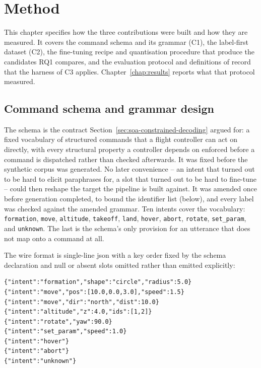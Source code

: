 \chapter{Method}
\label{chap:method}

This chapter specifies how the three contributions were built and how they are measured. It covers
the command schema and its grammar (C1), the label-first dataset (C2), the fine-tuning recipe and
quantisation procedure that produce the candidates RQ1 compares, and the evaluation protocol and
definitions of record that the harness of C3 applies. Chapter~\ref{chap:results} reports what that
protocol measured.

\section{Command schema and grammar design}
\label{sec:schema}
The schema is the contract Section~\ref{sec:soa-constrained-decoding} argued for: a fixed vocabulary of
structured commands that a flight controller can act on directly, with every structural property a
controller depends on enforced before a command is dispatched rather than checked afterwards. It
was fixed before the synthetic corpus was generated. No later convenience -- an intent that turned
out to be hard to elicit paraphrases for, a slot that turned out to be hard to fine-tune -- could
then reshape the target the pipeline is built against. It was amended once before generation
completed, to bound the identifier list (below), and every label was checked against the amended
grammar. Ten intents cover the vocabulary: \texttt{formation}, \texttt{move}, \texttt{altitude},
\texttt{takeoff}, \texttt{land}, \texttt{hover}, \texttt{abort}, \texttt{rotate},
\texttt{set\_param}, and \texttt{unknown}. The last is the schema's only provision for an utterance
that does not map onto a command at all.

The wire format is single-line \gls{json} with a key order fixed by the schema declaration and null
or absent slots omitted rather than emitted explicitly:

\begin{lstlisting}[basicstyle=\ttfamily\small, breaklines=true]
{"intent":"formation","shape":"circle","radius":5.0}
{"intent":"move","pos":[10.0,0.0,3.0],"speed":1.5}
{"intent":"move","dir":"north","dist":10.0}
{"intent":"altitude","z":4.0,"ids":[1,2]}
{"intent":"rotate","yaw":90.0}
{"intent":"set_param","speed":1.0}
{"intent":"hover"}
{"intent":"abort"}
{"intent":"unknown"}
\end{lstlisting}

